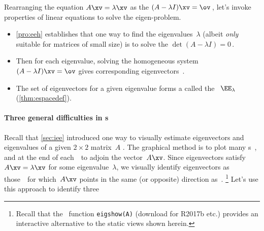 Rearranging the equation \(A\xv=\lambda\xv\) as the   \((A-\lambda I)\xv=\ov\)\,, let's invoke properties of linear equations to solve the eigen-problem.
\begin{itemize}
\item \cref{pro:eeh} establishes that one way to find the eigenvalues~\(\lambda\) (albeit \emph{only} suitable for matrices of small size) is to solve the  \(\det(A-\lambda I)=0\)\,. 
\item Then for each eigenvalue, solving the homogeneous system \((A-\lambda I)\xv=\ov\) gives corresponding eigenvectors~\xv. 
\item The set of eigenvectors for a given eigenvalue forms a  called the ~\(\EE_\lambda\) (\cref{thm:espacedef}).

\end{itemize}






\paragraph{Three general difficulties in s}
Recall that \cref{sec:iee} introduced one way to visually estimate eigenvectors and eigenvalues of a given \(2\times2\) matrix~\(A\) \cite[]{Schonefeld1995}. 
The graphical method is to plot many s~\xv, and at the end of each~\xv\ to adjoin the vector~\(A\xv\).
Since eigenvectors satisfy \(A\xv=\lambda\xv\) for some  eigenvalue~\(\lambda\), we visually identify eigenvectors as those~\xv\ for which~\(A\xv\) points in the same (or opposite) direction as~\xv.%
\footnote{Recall that the \script[1]\ function \texttt{eigshow(A)} (download for R2017b etc.) provides an interactive alternative to the static views shown herein.}
Let's use this approach to identify three 

